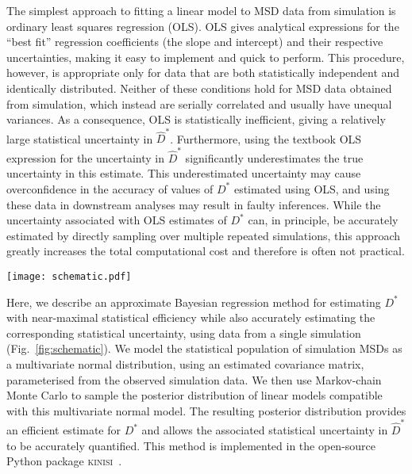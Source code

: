 \documentclass[reprint,superscriptaddress,nobibnotes,amsmath,amssymb,aps,prx,hidelinks,linenumbers]{revtex4-2}
\newcommand{\Dest}{\ensuremath{\widehat{D}^*}}
\newcommand{\D}{\ensuremath{D^*}}
\begin{document}
The simplest approach to fitting a linear model to MSD data from simulation is ordinary least squares regression (OLS).
OLS gives analytical expressions for the ``best fit'' regression coefficients (the slope and intercept) and their respective uncertainties, making it easy to implement and quick to perform.
This procedure, however, is appropriate only for data that are both statistically independent and identically distributed.
Neither of these conditions hold for MSD data obtained from simulation, which instead are serially correlated and usually have unequal variances.
As a consequence, OLS is statistically inefficient, giving a relatively large statistical uncertainty in $\Dest$.
Furthermore, using the textbook OLS expression for the uncertainty in $\Dest$ significantly underestimates the true uncertainty in this estimate.
This underestimated uncertainty may cause overconfidence in the accuracy of values of $\D$ estimated using OLS, and using these data in downstream analyses may result in faulty inferences.
While the uncertainty associated with OLS estimates of $\D$ can, in principle, be accurately estimated by directly sampling over multiple repeated simulations, this approach greatly increases the total computational cost and therefore is often not practical.

\begin{figure*}
    \centering
    \texttt{[image: schematic.pdf]}
    \caption{
        A schematic diagram of the Bayesian regression method described in this work, from running simulations through the sampling of displacement, variance and covariance estimation and final the sampling process to give the marginal posterior distribution for $\D$.}
    \label{fig:schematic}
\end{figure*}

Here, we describe an approximate Bayesian regression method for estimating $\D$ with near-maximal statistical efficiency while also accurately estimating the corresponding statistical uncertainty, using data from a single simulation (Fig.~\ref{fig:schematic}).
We model the statistical population of simulation MSDs as a multivariate normal distribution, using an estimated covariance matrix, parameterised from the observed simulation data.
We then use Markov-chain Monte Carlo to sample the posterior distribution of linear models compatible with this multivariate normal model.
The resulting posterior distribution provides an efficient estimate for $\D$ and allows the associated statistical uncertainty in $\Dest$ to be accurately quantified.
This method is implemented in the open-source Python package \textsc{kinisi}~\cite{mccluskey_kinisi_2022}.
\end{document}
